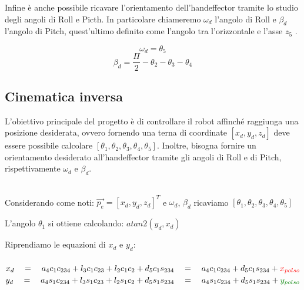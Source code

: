 \documentclass[a4paper]{article}
\begin{document}
    \begin{text}
        Infine è anche possibile ricavare l'orientamento dell'handeffector tramite lo studio degli angoli di Roll e Picth. In particolare chiameremo $\omega_d$ l'angolo di Roll e $\beta_d$ l'angolo di Pitch, quest'ultimo definito come l'angolo tra l’orizzontale e l’asse $z_5$ .
    \end{text}
    
    \[\omega_d = \theta_5\]
    \[\beta_d = \frac{\Pi}{2}-\theta_2-\theta_3-\theta_4\]
    
    
    
    \subsection{Cinematica inversa}
    
    \begin{text}
        L'obiettivo principale del progetto è di controllare il robot affinché raggiunga una posizione desiderata, ovvero fornendo una terna di coordinate $[x_d, y_d, z_d]$ deve essere possibile calcolare  $[\theta_1, \theta_2, \theta_3, \theta_4, \theta_5]$. Inoltre, bisogna fornire un orientamento desiderato all'handeffector tramite gli angoli di Roll e di Pitch, rispettivamente $\omega_d$ e $\beta_d$.\\ \\
    \end{text}
    
    \begin{text}
        Considerando come noti: \qquad $\vec{p_e} = [x_d, y_d, z_d]^T$ \quad e \quad $\omega_d$, $\beta_d$ \quad ricaviamo \quad $[\theta_1, \theta_2, \theta_3, \theta_4, \theta_5]$ \\ 
    \end{text}
    
    \begin{text}
        L'angolo $\theta_1$ si ottiene calcolando: \quad $atan2(y_d, x_d)$\\
    \end{text}
    
    \begin{text}
        Riprendiamo le equazioni di $x_d$ e $y_d$:\\ \\
        $x_d \quad = \quad a_4 c_1 c_{234} + l_3 c_1 c_{23} + l_2 c_1 c_2 + d_5 c_1 s_{234} \quad = \quad a_4 c_1 c_{234} + d_5 c_1 s_{234} + \textcolor{red}{x_{polso}}$ \\
        $y_d \quad = \quad a_4 s_1 c_{234} + l_3 s_1 c_{23} + l_2 s_1 c_2 + d_5 s_1 s_{234} \quad = \quad a_4 s_1 c_{234} + d_5 s_1 s_{234} +  \textcolor[rgb]{0.004, 0.5, 0.004}{y_{polso}}$\\
    \end{text}
    
\end{document}

